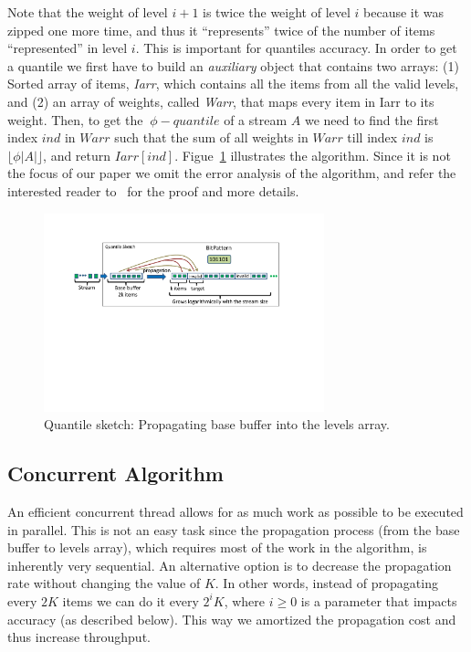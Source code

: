 Note that the weight of level $i+1$ is twice the weight of level
$i$ because it was zipped one more time, and thus it
``represents'' twice of the number of items ``represented'' in
level $i$.
This is important for quantiles accuracy.
In order to get a quantile we first have to build an
\emph{auxiliary} object that contains two arrays:
(1) Sorted array of items, \emph{Iarr}, which 
contains all the items from all the valid levels, and (2) an
array of weights, called \emph{Warr}, that maps every item in
Iarr to its weight.
Then, to get the $~\phi - quantile$ of a stream $A$
we need to find the first index $ind$ in $Warr$ such that the
sum of all weights in $Warr$ till index $ind$ is $\lfloor \phi |A|
\rfloor$, and return $Iarr[ind]$.
Figue~\ref{fig:quantilesMerge} illustrates the algorithm.
Since it is not the focus of our paper we omit the error analysis
of the algorithm, and refer the interested reader to~\cite{} for
the proof and more details.

\begin{figure}[H]
    \centering
    \includegraphics[width=3.2in]{images/quantilesPropogation.pdf}
    \caption{Quantile sketch: Propagating base buffer
    into the levels array.}
    \label{fig:quantilesMerge}
\end{figure}


\subsection{Concurrent Algorithm}

An efficient concurrent thread allows for as much work as possible to be executed in parallel.
This is not an easy task since the propagation process (from the base buffer to levels
array), which requires most of the work in the algorithm, is
inherently very sequential.
An alternative option is to decrease the propagation rate without changing
the value of $K$. 
In other words, instead of propagating every $2K$ items we can
do it every $2^{i}K$, where $i \geq 0$ is a parameter that
impacts accuracy (as described below).
This way we amortized the propagation cost and thus increase
throughput.


